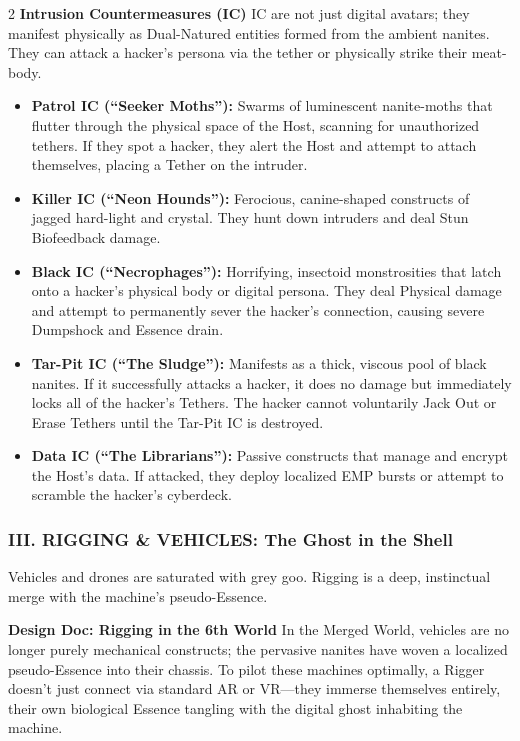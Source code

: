 \documentclass[
  oneside]{article}
\providecommand{\tightlist}{%
  \setlength{\itemsep}{0pt}\setlength{\parskip}{0pt}}
\begin{document}
\begin{multicols}{2}
\textbf{Intrusion Countermeasures (IC)} IC are not
just digital avatars; they manifest physically as
Dual-Natured entities formed from the ambient
nanites. They can attack a hacker's persona via
the tether or physically strike their meat-body.

\begin{itemize}
\tightlist
\item
  \textbf{Patrol IC (``Seeker Moths''):} Swarms of
  luminescent nanite-moths that flutter through
  the physical space of the Host, scanning for
  unauthorized tethers. If they spot a hacker,
  they alert the Host and attempt to attach
  themselves, placing a Tether on the intruder.
\item
  \textbf{Killer IC (``Neon Hounds''):} Ferocious,
  canine-shaped constructs of jagged hard-light
  and crystal. They hunt down intruders and deal
  Stun Biofeedback damage.
\item
  \textbf{Black IC (``Necrophages''):} Horrifying,
  insectoid monstrosities that latch onto a
  hacker's physical body or digital persona. They
  deal Physical damage and attempt to permanently
  sever the hacker's connection, causing severe
  Dumpshock and Essence drain.
\item
  \textbf{Tar-Pit IC (``The Sludge''):} Manifests
  as a thick, viscous pool of black nanites. If it
  successfully attacks a hacker, it does no damage
  but immediately locks all of the hacker's
  Tethers. The hacker cannot voluntarily Jack Out
  or Erase Tethers until the Tar-Pit IC is
  destroyed.
\item
  \textbf{Data IC (``The Librarians''):} Passive
  constructs that manage and encrypt the Host's
  data. If attacked, they deploy localized EMP
  bursts or attempt to scramble the hacker's
  cyberdeck.
\end{itemize}

\hypertarget{iii.-rigging-vehicles-the-ghost-in-the-shell}{%
\subsubsection{III. RIGGING \& VEHICLES: The Ghost
in the
Shell}\label{iii.-rigging-vehicles-the-ghost-in-the-shell}}

Vehicles and drones are saturated with grey goo.
Rigging is a deep, instinctual merge with the
machine's pseudo-Essence.

\textbf{Design Doc: Rigging in the 6th World} In
the Merged World, vehicles are no longer purely
mechanical constructs; the pervasive nanites have
woven a localized pseudo-Essence into their
chassis. To pilot these machines optimally, a
Rigger doesn't just connect via standard AR or
VR---they immerse themselves entirely, their own
biological Essence tangling with the digital ghost
inhabiting the machine.


\end{multicols}
\end{document}
